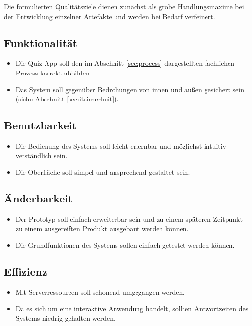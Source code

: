 \documentclass[a4paper,11pt,listof=numbered,glossary=totoc,parskip=half,toc=bib]{scrreprt}
\begin{document}
	Die formulierten Qualitätsziele dienen zunächst als grobe Handlungsmaxime bei der Entwicklung einzelner Artefakte und werden bei Bedarf verfeinert.
	
	\subsection{Funktionalität}
	
	\begin{itemize}
		\item Die Quiz-App soll den im Abschnitt \ref{sec:process} dargestellten fachlichen Prozess korrekt abbilden.
		\item Das System soll gegenüber Bedrohungen von innen und außen gesichert sein (siehe Abschnitt \ref{sec:itsicherheit}).		
	\end{itemize}
	
	\subsection{Benutzbarkeit}
	\begin{itemize}
		\item Die Bedienung des Systems soll leicht erlernbar und möglichst intuitiv verständlich sein.
		\item Die Oberfläche soll simpel und ansprechend gestaltet sein.
	\end{itemize}
	
	\subsection{Änderbarkeit}
	\begin{itemize}
		\item Der Prototyp soll einfach erweiterbar sein und zu einem späteren Zeitpunkt zu einem ausgereiften Produkt ausgebaut werden können.
		\item Die Grundfunktionen des Systems sollen einfach getestet werden können.
	\end{itemize}
	
	\subsection{Effizienz}
	\begin{itemize}
		\item Mit Serverressourcen soll schonend umgegangen werden.
		\item Da es sich um eine interaktive Anwendung handelt, sollten Antwortzeiten des Systems niedrig gehalten werden.
	\end{itemize}
	
\end{document}
